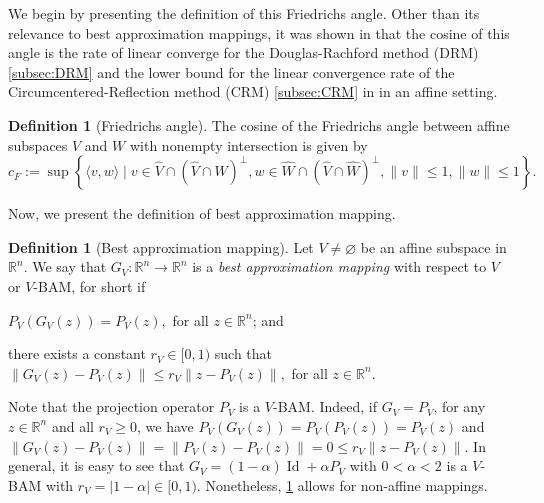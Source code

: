 \documentclass[smallextended,numbook,nospthms]{svjour3}
\theoremstyle{plain}
\theoremstyle{definition}
\newtheorem{definition}[theorem]{Definition}
\def\RR{\mathds R}
\DeclareMathOperator{\Id}{Id}
\begin{document}
We begin by presenting the definition of this Friedrichs angle. Other than its relevance to best approximation mappings, it was shown in \cite{BCNPW14} that the cosine of this angle is the rate of linear converge for the Douglas-Rachford method (DRM) \cref{subsec:DRM} and the lower bound for the linear convergence rate of the Circumcentered-Reflection method (CRM) \cref{subsec:CRM} in \cite{Behling:2018} in an affine setting.
\begin{definition}[Friedrichs angle]\label{def:Friedrich}
	The cosine of the Friedrichs angle between affine subspaces $V$ and $W$ with nonempty intersection is given by
	$$
	c_{F}:=\sup \left\{\langle v, w\rangle \mid v \in \hat{V} \cap(\hat{V} \cap \hat{W})^{\perp}, w \in \hat{W} \cap(\hat{V} \cap \hat{W})^{\perp},\|v\| \leq 1,\|w\| \leq 1\right\}.
	$$
\end{definition}

Now, we present the definition of best approximation mapping.
\begin{definition}[Best approximation mapping]\label{def:BAM}
Let $V \neq \varnothing$ be an affine subspace in $\RR^{n}$. We say that $G_{V}: \RR^{n} \rightarrow \RR^{n}$ is a \emph{best approximation mapping} with respect to $V$ or $V$-BAM, for short if
\begin{listi}
	\item $P_{V}\left(G_{V}(z)\right)=P_{V}(z),$ for all $z \in \RR^{n}$; and
	\item there exists a constant $r_{V} \in[0,1)$ such that $\left\|G_{V}(z)-P_{V}(z)\right\| \leq r_{V}\left\|z-P_{V}(z)\right\|,$ for all $z \in \RR^{n}$.
\end{listi}
\end{definition}

Note that the projection operator $P_{V}$ is a $V$-BAM. Indeed, if $G_{V}=P_{V}$, for any $z \in \RR^{n}$ and all $r_{V} \geq 0$, we have $P_{V}\left(G_{V}(z)\right)=P_{V}\left(P_{V}(z)\right)=P_{V}(z)$ and $\left\|G_{V}(z)-P_{V}(z)\right\|=\left\|P_{V}(z)-P_{V}(z)\right\|=0 \leq r_{V}\left\|z-P_{V}(z)\right\|$. 
In general, it is easy to see that $G_{V} = (1-\alpha) \Id + \alpha P_{V}$ with $0<\alpha<2$ is a $V$-BAM with $r_{V}=|1-\alpha| \in[0,1)$. Nonetheless, \cref{def:BAM} allows for non-affine mappings.
\end{document}
